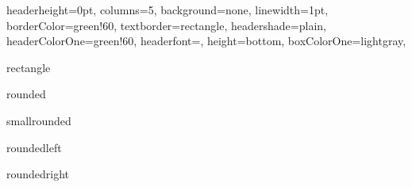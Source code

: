 \documentclass[portrait,fontscale=1,margin=0.2cm,paperwidth=15truecm, paperheight=1.5cm,debug]{baposter}
\begin{document}
\begin{poster}{
  headerheight=0pt,
  columns=5,
  background=none,
  linewidth=1pt,
  borderColor=green!60,
  textborder=rectangle,
  headershade=plain,
  headerColorOne=green!60,
  headerfont={},
  height=bottom,
  boxColorOne=lightgray,
}{}{}{}{}

\begin{posterbox}[column=0,headerfont={},headershape=rectangle]{rectangle}
\end{posterbox}

\begin{posterbox}[column=1,headerfont={},headershape=rounded]{rounded}
\end{posterbox}

\begin{posterbox}[column=2,headerfont={},headershape=smallrounded]{smallrounded}
\end{posterbox}

\begin{posterbox}[column=3,headerfont={},headershape=roundedleft]{roundedleft}
\end{posterbox}

\begin{posterbox}[column=4,headerfont={},headershape=roundedright]{roundedright}
\end{posterbox}

\end{poster}
\end{document}
